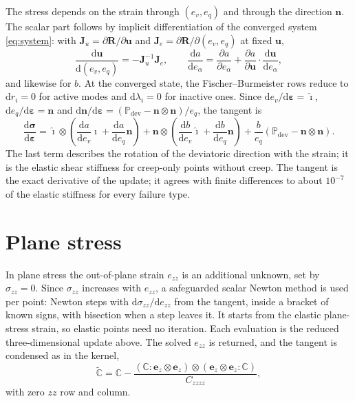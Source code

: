 \documentclass[11pt,a4paper]{article}
\newcommand{\bsig}{\bm{\sigma}}
\newcommand{\beps}{\bm{\varepsilon}}
\newcommand{\ihat}{\hat{\bm{\imath}}}
\newcommand{\bn}{\bm{n}}
\begin{document}
The stress depends on the strain through $(e_v,e_q)$ and through the direction $\bn$. The scalar
part follows by implicit differentiation of the converged system \eqref{eq:system}: with
$\bm{J}_u=\partial\bm{R}/\partial\bm{u}$ and $\bm{J}_e=\partial\bm{R}/\partial(e_v,e_q)$ at fixed
$\bm{u}$,
\begin{equation}
  \frac{\mathrm{d}\bm{u}}{\mathrm{d}(e_v,e_q)}=-\bm{J}_u^{-1}\bm{J}_e,\qquad
  \frac{\mathrm{d}a}{\mathrm{d}e_\alpha}=\frac{\partial a}{\partial e_\alpha}+\frac{\partial a}{\partial\bm{u}}\cdot\frac{\mathrm{d}\bm{u}}{\mathrm{d}e_\alpha},
\end{equation}
and likewise for $b$. At the converged state, the Fischer--Burmeister rows reduce to
$\mathrm{d}r_i=0$ for active modes and $\mathrm{d}\lambda_i=0$ for inactive ones. Since
$\mathrm{d}e_v/\mathrm{d}\beps=\ihat$, $\mathrm{d}e_q/\mathrm{d}\beps=\bn$ and
$\mathrm{d}\bn/\mathrm{d}\beps=(\mathbb{P}_\mathrm{dev}-\bn\otimes\bn)/e_q$, the tangent is
\begin{equation}
  \frac{\mathrm{d}\bsig}{\mathrm{d}\beps}=
  \ihat\otimes\left(\frac{\mathrm{d}a}{\mathrm{d}e_v}\ihat+\frac{\mathrm{d}a}{\mathrm{d}e_q}\bn\right)
  +\bn\otimes\left(\frac{\mathrm{d}b}{\mathrm{d}e_v}\ihat+\frac{\mathrm{d}b}{\mathrm{d}e_q}\bn\right)
  +\frac{b}{e_q}\left(\mathbb{P}_\mathrm{dev}-\bn\otimes\bn\right).
\end{equation}
The last term describes the rotation of the deviatoric direction with the strain; it is the
elastic shear stiffness for creep-only points without creep. The tangent is the exact
derivative of the update; it agrees with finite differences to about $10^{-7}$ of the elastic
stiffness for every failure type.

\section{Plane stress}

In plane stress the out-of-plane strain $e_{zz}$ is an additional unknown, set by
$\sigma_{zz}=0$. Since $\sigma_{zz}$ increases with $e_{zz}$, a safeguarded scalar Newton method
is used per point: Newton steps with $\mathrm{d}\sigma_{zz}/\mathrm{d}e_{zz}$ from the tangent,
inside a bracket of known signs, with bisection when a step leaves it. It starts from the elastic
plane-stress strain, so elastic points need no iteration. Each evaluation is the reduced
three-dimensional update above. The solved $e_{zz}$ is returned, and the tangent is condensed as
in the kernel,
\begin{equation}
  \tilde{\mathbb{C}}=\mathbb{C}-\frac{(\mathbb{C}:\bm{e}_z\otimes\bm{e}_z)\otimes(\bm{e}_z\otimes\bm{e}_z:\mathbb{C})}{C_{zzzz}},
\end{equation}
with zero $zz$ row and column.
\end{document}
